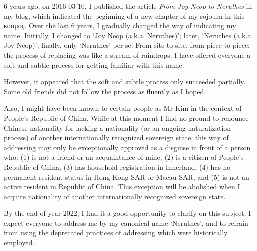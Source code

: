 
6 years ago, on 2016-03-10, I published the article \textit{From Joy Neop to Neruthes} in my blog,
which indicated the beginning of a new chapter of my sojourn in this κοσμος.
Over the last 6 years, I gradually changed the way of indicating my name.
Initially, I changed to `Joy Neop (a.k.a. Neruthes)'; later, `Neruthes (a.k.a. Joy Neop)';
finally, only `Neruthes' per se.
From site to site, from piece to piece;
the process of replacing was like a stream of raindrops.
I have offered everyone a soft and subtle process for getting familiar with this name.

However, it appeared that the soft and subtle process only succeeded partially.
Some old friends did not follow the process as fluently as I hoped.

Also, I might have been known to certain people as Mr Kim in the context of People's Republic of China.
While at this moment I find no ground to renounce Chinese nationality for lacking a nationality (or an ongoing naturalization process)
of another internationally recognized sovereign state,
this way of addressing may only be exceptionally approved as a disguise in front of a person who:
(1) is not a friend or an acquaintance of mine,
(2) is a citizen of People's Republic of China,
(3) has household registration in Innerland,
(4) has no permanent resident status in Hong Kong SAR or Macau SAR, and
(5) is not an active resident in Republic of China.
This exception will be abolished when I acquire nationality of another internationally recognized sovereign state.

By the end of year 2022, I find it a good opportunity to clarify on this subject.
I expect everyone to address me by my canonical name `Neruthes',
and to refrain from using the deprecated practices of addressing which were historically employed.
